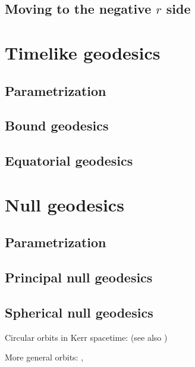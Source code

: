 \subsection{Moving to the negative $r$ side}


\section{Timelike geodesics}

\subsection{Parametrization}

\subsection{Bound geodesics}

\subsection{Equatorial geodesics}


\section{Null geodesics}

\subsection{Parametrization}

\subsection{Principal null geodesics}

\subsection{Spherical null geodesics}






Circular orbits in Kerr spacetime: \cite{BardePT72} (see also \cite{Barde73})

More general orbits: \cite{Perez-Giz11}, \cite{GrossLP12}
